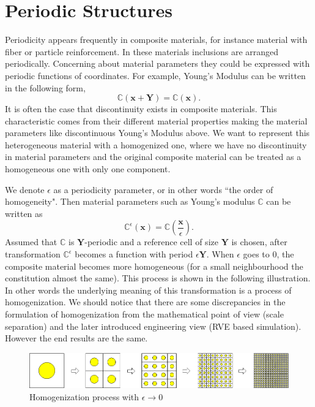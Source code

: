 \documentclass[10pt,a4paper]{scrreprt}
\begin{document}
\section{Periodic Structures}
\label{sec:peri}
Periodicity appears frequently in composite materials, for instance material with fiber or particle reinforcement. In these materials inclusions are arranged periodically. Concerning about material parameters they could be expressed with periodic functions of coordinates. For example, Young's Modulus can be written in the following form,
%
\begin{equation}
\label{eq:periodic 1}
\mathbb{C}(\mathbf{x}+\mathbf{Y}) = \mathbb{C}(\mathbf{x}).
\end{equation}
%
It is often the case that discontinuity exists in composite materials. This characteristic comes from their different material properties making the material parameters like discontinuous Young's Modulus above. We want to represent this heterogeneous material with a homogenized one, where we have no discontinuity in material parameters and the original composite material can be treated as a homogeneous one with only one component.

We denote $\epsilon$ as a periodicity parameter, or in other words ``the order of homogeneity". Then material parameters such as Young's modulus $\mathbb{C}$ can be written as
\begin{equation}
\mathbb{C}^{\epsilon}(\mathbf{x}) = \mathbb{C} \left( \dfrac{\mathbf{x}}{\epsilon} \right).
\end{equation}
Assumed that $\mathbb{C}$ is $\mathbf{Y}$-periodic and a reference cell of size $\mathbf{Y}$ is chosen, after transformation $\mathbb{C}^{\epsilon}$ becomes a function with period $\epsilon \mathbf{Y}$. When $\epsilon$ goes to 0, the composite material becomes more homogeneous (for a small neighbourhood the constitution almost the same). This process is shown in the following illustration. In other words the underlying meaning of this transformation is a process of homogenization. We should notice that there are some discrepancies in the formulation of homogenization from the mathematical point of view (scale separation) and the later introduced engineering view (RVE based simulation). However the end results are the same.

\begin{figure}[h]
  \centering
    \label{fig: homo proc}
    \includegraphics[width=0.8\linewidth]{../pics/homo_proc.png}
  \caption{Homogenization process with $\epsilon \to 0$}
\end{figure}
\end{document}
